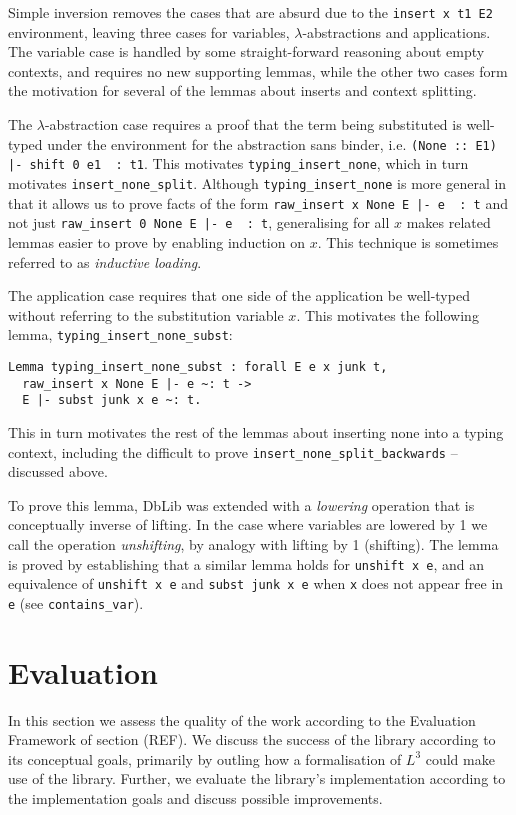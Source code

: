 \documentclass[]{unswthesis}
\let\c\texttt
\let\i\textit
\begin{document}
Simple inversion removes the cases that are absurd due to the \c{insert x t1 E2} environment, leaving three cases for variables, $\lambda$-abstractions and applications. The variable case is handled by some straight-forward reasoning about empty contexts, and requires no new supporting lemmas, while the other two cases form the motivation for several of the lemmas about inserts and context splitting.

The $\lambda$-abstraction case requires a proof that the term being substituted is well-typed under the environment for the abstraction sans binder, i.e. \c{(None :: E1) |- shift 0 e1 ~: t1}. This motivates \c{typing_insert_none}, which in turn motivates \c{insert_none_split}. Although \c{typing_insert_none} is more general in that it allows us to prove facts of the form \c{raw_insert x None E |- e ~: t} and not just \c{raw_insert 0 None E |- e ~: t}, generalising for all $x$ makes related lemmas easier to prove by enabling induction on $x$. This technique is sometimes referred to as \i{inductive loading}.

The application case requires that one side of the application be well-typed without referring to the substitution variable $x$. This motivates the following lemma, \c{typing_insert_none_subst}:

\begin{verbatim}
Lemma typing_insert_none_subst : forall E e x junk t,
  raw_insert x None E |- e ~: t ->
  E |- subst junk x e ~: t.
\end{verbatim}

This in turn motivates the rest of the lemmas about inserting none into a typing context, including the difficult to prove \c{insert_none_split_backwards} -- discussed above.

To prove this lemma, DbLib was extended with a \i{lowering} operation that is conceptually inverse of lifting. In the case where variables are lowered by 1 we call the operation \i{unshifting}, by analogy with lifting by 1 (shifting). The lemma is proved by establishing that a similar lemma holds for \c{unshift x e}, and an equivalence of \c{unshift x e} and \c{subst junk x e} when \c{x} does not appear free in \c{e} (see \c{contains_var}).

\chapter{Evaluation}

In this section we assess the quality of the work according to the Evaluation Framework of section (REF). We discuss the success of the library according to its conceptual goals, primarily by outling how a formalisation of $L^3$ could make use of the library. Further, we evaluate the library's implementation according to the implementation goals and discuss possible improvements.
\end{document}
